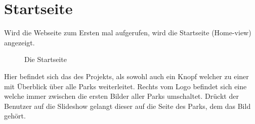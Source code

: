 \section{Startseite}
\label{home}

Wird die Webseite zum Ersten mal aufgerufen, wird die Startseite (Home-view) angezeigt. 

\begin{figure}[H]
    \begin{center}
      \caption{Die Startseite}
    \end{center}
\end{figure}

Hier befindet sich das  des Projekts, als sowohl auch ein Knopf welcher zu einer  mit Überblick über alle 
Parks weiterleitet. Rechts vom Logo befindet sich eine  welche immer zwischen die ersten Bilder 
aller Parks umschaltet. Drückt der Benutzer auf die Slideshow gelangt dieser auf die  
Seite des Parks, dem das Bild gehört. 

